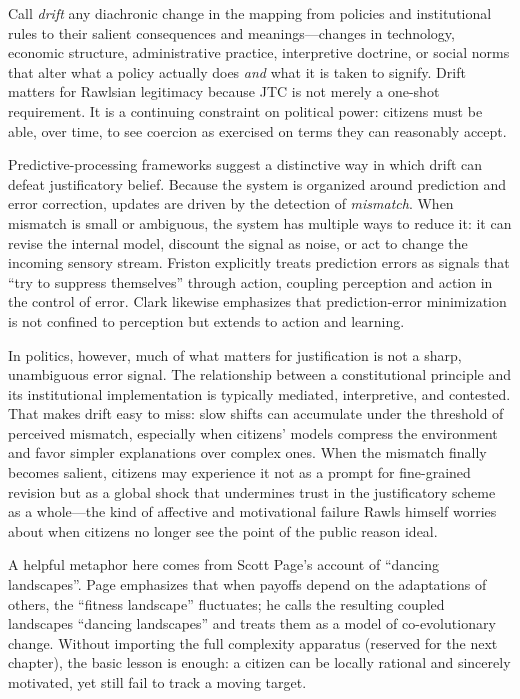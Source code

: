 \documentclass[12pt]{report}
\begin{document}
Call \emph{drift} any diachronic change in the mapping from policies and institutional rules to their salient consequences and meanings---changes in technology, economic structure, administrative practice, interpretive doctrine, or social norms that alter what a policy actually does \emph{and} what it is taken to signify. Drift matters for Rawlsian legitimacy because JTC is not merely a one-shot requirement. It is a continuing constraint on political power: citizens must be able, over time, to see coercion as exercised on terms they can reasonably accept. \parencite[pp.~446--447]{rawls2005political}

Predictive-processing frameworks suggest a distinctive way in which drift can defeat justificatory belief. Because the system is organized around prediction and error correction, updates are driven by the detection of \emph{mismatch}. When mismatch is small or ambiguous, the system has multiple ways to reduce it: it can revise the internal model, discount the signal as noise, or act to change the incoming sensory stream. Friston explicitly treats prediction errors as signals that \enquote{try to suppress themselves} through action, coupling perception and action in the control of error. \parencite[p.~134]{friston2010freeenergy} Clark likewise emphasizes that prediction-error minimization is not confined to perception but extends to action and learning. \parencite[p.~190]{clark2013whatever}

In politics, however, much of what matters for justification is not a sharp, unambiguous error signal. The relationship between a constitutional principle and its institutional implementation is typically mediated, interpretive, and contested. That makes drift easy to miss: slow shifts can accumulate under the threshold of perceived mismatch, especially when citizens' models compress the environment and favor simpler explanations over complex ones. \parencite[p.~128]{friston2010freeenergy}\parencite[pp.~491--492]{ganguli2012compressed} When the mismatch finally becomes salient, citizens may experience it not as a prompt for fine-grained revision but as a global shock that undermines trust in the justificatory scheme as a whole---the kind of affective and motivational failure Rawls himself worries about when citizens no longer see the point of the public reason ideal. \parencite[p.~485]{rawls2005political}

A helpful metaphor here comes from Scott Page's account of \enquote{dancing landscapes}. Page emphasizes that when payoffs depend on the adaptations of others, the \enquote{fitness landscape} fluctuates; he calls the resulting coupled landscapes \enquote{dancing landscapes} and treats them as a model of co-evolutionary change. \parencite[p.~94]{page2011diversity} Without importing the full complexity apparatus (reserved for the next chapter), the basic lesson is enough: a citizen can be locally rational and sincerely motivated, yet still fail to track a moving target.
\end{document}

